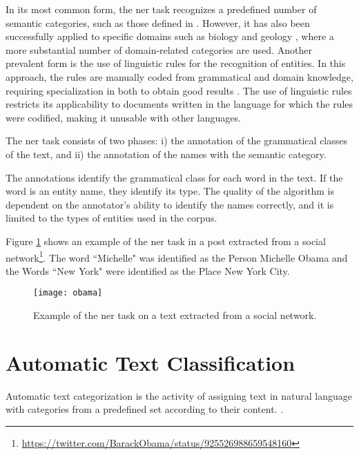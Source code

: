 In its most common form, the \gls{ner} task recognizes a predefined number of semantic categories, such as those defined in \cite{grishman1996message}. However, it has also been successfully applied to specific domains such as biology \cite{campos2012biomedical} and geology \cite{sobhana2010conditional}, where a more substantial number of domain-related categories are used. Another prevalent form is the use of linguistic rules for the recognition of entities. In this approach, the rules are manually coded from grammatical and domain knowledge, requiring specialization in both to obtain good results \cite{nadeau2007survey}. The use of linguistic rules restricts its applicability to documents written in the language for which the rules were codified, making it unusable with other languages.

The \gls{ner} task consists of two phases: i) the annotation of the grammatical classes of the text, and ii) the annotation of the names with the semantic category.

The annotations identify the grammatical class for each word in the text. If the word is an entity name, they identify its type. The quality of the algorithm is dependent on the annotator's ability to identify the names correctly, and it is limited to the types of entities used in the corpus. 

Figure \ref{fig:obama-example} shows an example of the \gls{ner} task in a post extracted from a social network\footnote{\url{https://twitter.com/BarackObama/status/925526988659548160}}.  The word ``Michelle" was identified as the Person Michelle Obama and the Words ``New York" were identified as the Place New York City. 

 
\begin{figure}[H]
  \texttt{[image: obama]}
  \caption{Example of the \gls{ner} task on a text extracted from a social network.}
  \label{fig:obama-example}
\end{figure}


\section{\hspace*{3pt}Automatic Text Classification}
\label{sec:definition-automatic-text-classification}

Automatic text categorization is the activity of assigning text in natural language with categories from a predefined set according to their content. \cite{yang1999evaluation}. 

